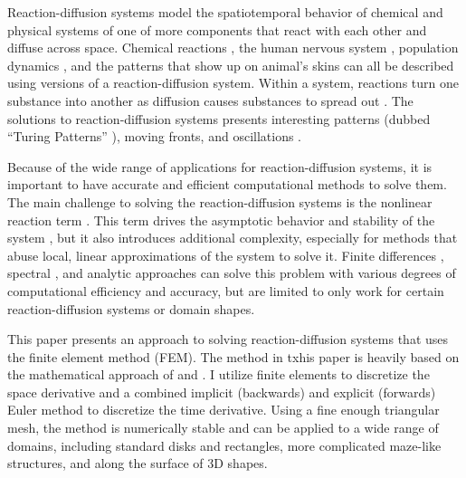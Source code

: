 Reaction-diffusion systems model the spatiotemporal behavior of chemical and physical systems of one of more components that react with each other and diffuse across space. Chemical reactions \parencites{zhabotinsky2007belousov}{graham1993temperature}, the human nervous system \parencite{fitzhugh1961impulses}, population dynamics \parencite{clair2024reaction}, and the patterns that show up on animal's skins \parencites{turing1990chemical}{de2020leopard} can all be described using versions of a reaction-diffusion system. Within a system, reactions turn one substance into another as diffusion causes substances to spread out \parencite{li2020reaction}. The solutions to reaction-diffusion systems presents interesting patterns (dubbed ``Turing Patterns'' \parencite{vittadello2021turing}), moving fronts, and oscillations \parencites{szalai2004turing}{rinzel1982propagation}{turing1990chemical}.

Because of the wide range of applications for reaction-diffusion systems, it is important to have accurate and efficient computational methods to solve them. The main challenge to solving the reaction-diffusion systems is the nonlinear reaction term \parencites{pao1982nonlinear}{martin1992nonlinear}. This term drives the asymptotic behavior and stability of the system \parencite{pao1982nonlinear}, but it also introduces additional complexity, especially for methods that abuse local, linear approximations of the system to solve it. Finite differences \parencite{hoff1978stability}, spectral \parencites{bueno2014fourier}{craster2018spectral}, and analytic \parencites{spendier2013analytic} approaches can solve this problem with various degrees of computational efficiency and accuracy, but are limited to only work for certain reaction-diffusion systems or domain shapes.

This paper presents an approach to solving reaction-diffusion systems that uses the finite element method (FEM). The method in txhis paper is heavily based on the mathematical approach of \autocite{sellami2020accelerating} and \autocite{lang1992finite}. I utilize finite elements to discretize the space derivative and a combined implicit (backwards) and explicit (forwards) Euler method to discretize the time derivative. Using a fine enough triangular mesh, the method is numerically stable and can be applied to a wide range of domains, including standard disks and rectangles, more complicated maze-like structures, and along the surface of 3D shapes.
